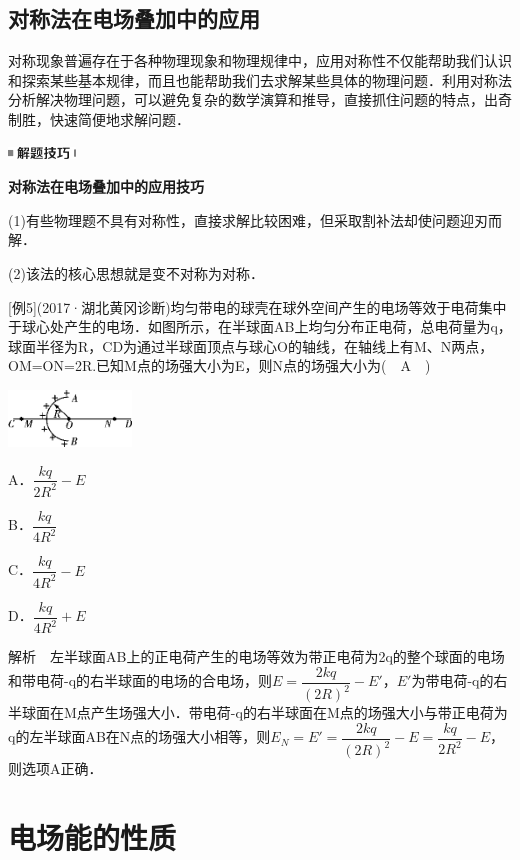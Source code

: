 \documentclass[cn,10.5pt,chinese,mac,chinesefont=founder]{elegantbook}
\begin{document}
\subsection{对称法在电场叠加中的应用}

对称现象普遍存在于各种物理现象和物理规律中，应用对称性不仅能帮助我们认识和探索某些基本规律，而且也能帮助我们去求解某些具体的物理问题．利用对称法分析解决物理问题，可以避免复杂的数学演算和推导，直接抓住问题的特点，出奇制胜，快速简便地求解问题．

\begin{center}\includegraphics[width=0.70833in,height=0.125in]{media/image37.png}

\textbf{对称法在电场叠加中的应用技巧}
\end{center}


(1)有些物理题不具有对称性，直接求解比较困难，但采取割补法却使问题迎刃而解．

(2)该法的核心思想就是变不对称为对称．

{[}例5{]}(2017·湖北黄冈诊断)均匀带电的球壳在球外空间产生的电场等效于电荷集中于球心处产生的电场．如图所示，在半球面AB上均匀分布正电荷，总电荷量为q，球面半径为R，CD为通过半球面顶点与球心O的轴线，在轴线上有M、N两点，OM=ON=2R.已知M点的场强大小为E，则N点的场强大小为(　A　)

\begin{center}\includegraphics[width=1.29167in,height=0.59375in]{media/image267.png}\end{center}

A．$\dfrac{kq}{2R^2}-E$ 

B．$\dfrac{kq}{4R^2}$

C．$\dfrac{kq}{4R^2}-E$ 

D．$\dfrac{kq}{4R^2}+E$

解析　左半球面AB上的正电荷产生的电场等效为带正电荷为2q的整个球面的电场和带电荷-q的右半球面的电场的合电场，则$E=\dfrac{2kq}{(2R)^2}-E'$，$E'$为带电荷-q的右半球面在M点产生场强大小．带电荷-q的右半球面在M点的场强大小与带正电荷为q的左半球面AB在N点的场强大小相等，则$E_N=E'=\dfrac{2kq}{(2R)^2} -E=\dfrac{kq}{2R^2} -E$，则选项A正确．
\newpage
\section{电场能的性质}
\end{document}
